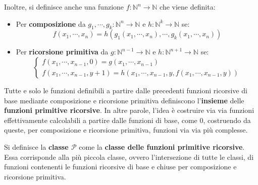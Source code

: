 \documentclass[a4paper]{article}
\begin{document}
	\noindent
	Inoltre, si definisce anche una funzione $f: \mathbb{N}^{n} \longrightarrow \mathbb{N}$ che viene definita:
	\begin{itemize}
		\item Per \textbf{composizione} da $g_{1}, \cdots, g_{k}: \mathbb{N}^{n} \longrightarrow \mathbb{N}$ e $h: \mathbb{N}^{k} \longrightarrow \mathbb{N}$ se:
		\begin{equation*}
			f\left(x_{1}, \cdots, x_{n}\right) = h\left(g_{1}\left(x_{1}, \cdots, x_{n}\right), \cdots, g_{k}\left(x_{1}, \cdots, x_{n}\right)\right)
		\end{equation*}
		
		\item Per \textbf{ricorsione primitiva} da $g:\mathbb{N}^{n-1} \longrightarrow \mathbb{N}$ e $h:\mathbb{N}^{n+1} \longrightarrow \mathbb{N}$ se:
		\begin{equation*}
			\begin{cases}
				f\left(x_{1}, \cdots, x_{n-1}, 0\right) = g\left(x_{1}, \cdots, x_{n-1}\right) \\
				f\left(x_{1}, \cdots, x_{n-1}, y+1\right) = h\left(x_{1}, \cdots, x_{n-1}, y, f\left(x_{1}, \cdots, x_{n-1}, y\right)\right)
			\end{cases}
		\end{equation*}
	\end{itemize}
	Tutte e solo le funzioni definibili a partire dalle precedenti funzioni ricorsive di base mediante composizione e ricorsione primitiva definiscono l'\textbf{insieme} delle \textcolor{Red3}{\textbf{funzioni primitive ricorsive}}. In altre parole, l'idea è costruire via via funzioni effettivamente calcolabili a partire dalle funzioni di base, come $0$, costruendo da queste, per composizione e ricorsione primitiva, funzioni via via più complesse.\newline
	
	\noindent
	Si definisce la \textbf{classe $\mathcal{P}$} come la \textbf{classe delle funzioni primitive ricorsive}. Essa corrisponde alla più piccola classe, ovvero l'intersezione di tutte le classi, di funzioni contenenti le funzioni ricorsive di base e chiuse per composizione e ricorsione primitiva.\newpage
	
\end{document}
